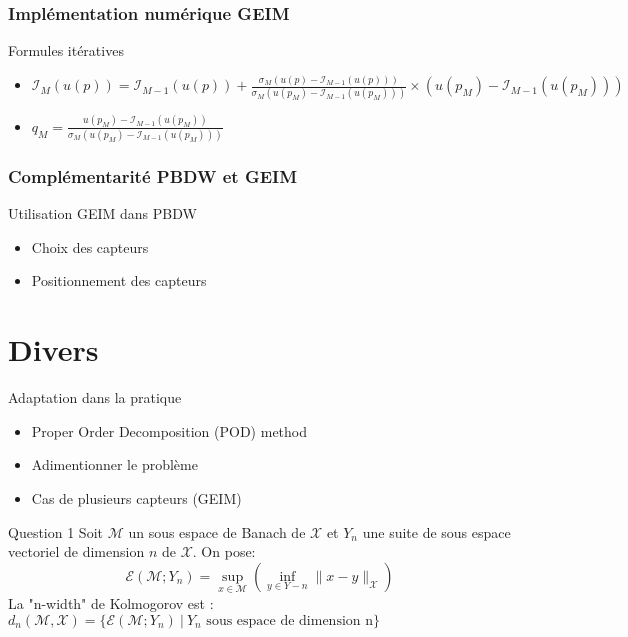 \documentclass[a4paper,10pt]{beamer}
\numberwithin{equation}{section}
\begin{document}
\begin{frame}
\frametitle{\sc Implémentation numérique GEIM}
\begin{block}{\sc Formules itératives}
	\begin{itemize}
		\item $ \mathcal{I}_{M}(u(p))=\mathcal{I}_{M-1}(u(p))+\frac{\sigma_{M}(u(p)-\mathcal{I}_{M-1}(u(p)))}{\sigma_{M}(u(p_{M})-\mathcal{I}_{M-1}(u(p_{M})))}\times (u(p_{M})-\mathcal{I}_{M-1}(u(p_{M})))$
		
		\item $q_{M}=\frac{u(p_{M})-\mathcal{I}_{M-1}(u(p_{M}))}{\sigma_{M}(u(p_{M})-\mathcal{I}_{M-1}(u(p_{M})))} $
	\end{itemize}
\end{block}

\end{frame}

\begin{frame}
\frametitle{\sc Complémentarité PBDW et GEIM}
\begin{block}{\sc Utilisation GEIM dans PBDW}
	\begin{itemize}[<+->]
		\item Choix des capteurs
		\item Positionnement des capteurs
	\end{itemize}
\end{block}
\end{frame}



\section{\sc Divers}

\begin{frame}
\begin{block}{\sc Adaptation dans la pratique}
	\begin{itemize}
		\item Proper Order Decomposition (POD) method
		\item Adimentionner le problème
		\item Cas de plusieurs capteurs (GEIM)
	\end{itemize}
\end{block}
\begin{block}{\sc Question 1}
	Soit $\mathcal{M}$ un sous espace de Banach de $\mathcal{X}$ et $Y_{n}$ une suite de sous espace vectoriel de dimension $n$ de $\mathcal{X}$. On pose: 
	$$\mathcal{E}(\mathcal{M};Y_{n})=\underset{x\in \mathcal{M}}{\sup}(\underset{y \in Y-{n}}{\inf}\| x-y\|_{\mathcal{X}})$$
	La "n-width" de Kolmogorov est :\\
	$d_{n}(\mathcal{M},\mathcal{X})=\{ \mathcal{E}(\mathcal{M};Y_{n})\ |\ Y_{n}  \mbox{ sous espace de dimension n} \}$
\end{block}
\end{frame}
\end{document}
